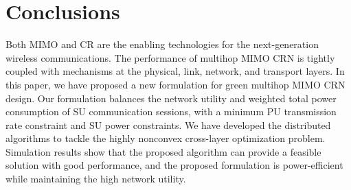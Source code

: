 \documentclass[12pt,onecolumn,tworows]{IEEEtran}
\begin{document}
\section{Conclusions}
Both MIMO and CR are the enabling technologies for the next-generation wireless communications.
The performance of multihop MIMO CRN is tightly coupled with mechanisms at the physical, link, network, and transport layers. In this paper, we have proposed a new formulation for green multihop MIMO CRN design. Our formulation balances the network utility and weighted total power consumption of SU communication sessions, with a minimum PU transmission rate constraint and SU power constraints. We have developed the distributed algorithms to tackle the highly nonconvex cross-layer optimization problem. Simulation results show that the proposed algorithm can provide a feasible solution with good performance, and the proposed formulation is power-efficient while maintaining the high network utility.

\ifCLASSOPTIONcaptionsoff
  \newpage
\fi
\end{document}
